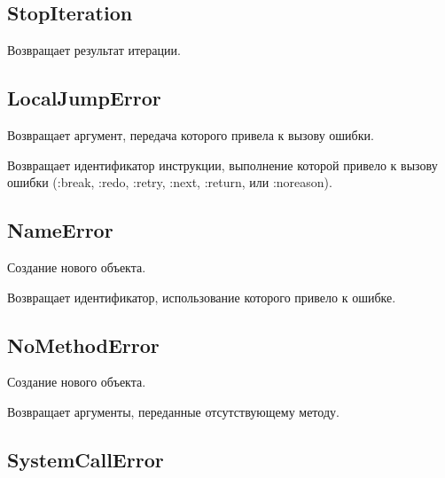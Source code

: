 \subsection*{StopIteration}

\begin{methodlist}
  Возвращает результат итерации.
\end{methodlist}

\subsection*{LocalJumpError}

\begin{methodlist}
  Возвращает аргумент, передача которого привела к вызову ошибки. 
 
  Возвращает идентификатор инструкции, выполнение которой привело к вызову ошибки (:break, :redo, :retry, :next, :return, или :noreason).
\end{methodlist}

\subsection*{NameError}

\begin{methodlist}
  Создание нового объекта. 

  Возвращает идентификатор, использование которого привело к ошибке.
\end{methodlist}

\subsection*{NoMethodError}

\begin{methodlist}
  Создание нового объекта. 

  Возвращает аргументы, переданные отсутствующему методу.
\end{methodlist}

\subsection*{SystemCallError}

